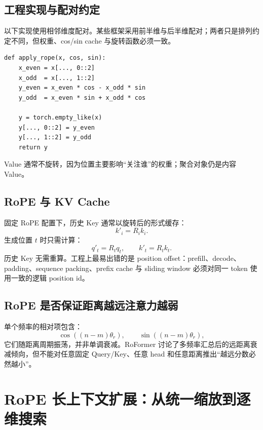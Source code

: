 \documentclass[UTF8,fontset=none,a4paper,10pt]{ctexart}
\begin{document}
\subsection{工程实现与配对约定}

以下实现使用相邻维度配对。某些框架采用前半维与后半维配对；两者只是排列约定不同，但权重、cos/sin cache 与旋转函数必须一致。

\begin{lstlisting}
def apply_rope(x, cos, sin):
    x_even = x[..., 0::2]
    x_odd  = x[..., 1::2]
    y_even = x_even * cos - x_odd * sin
    y_odd  = x_even * sin + x_odd * cos

    y = torch.empty_like(x)
    y[..., 0::2] = y_even
    y[..., 1::2] = y_odd
    return y
\end{lstlisting}

Value 通常不旋转，因为位置主要影响“关注谁”的权重；聚合对象仍是内容 Value。

\subsection{RoPE 与 KV Cache}

固定 RoPE 配置下，历史 Key 通常以旋转后的形式缓存：
\begin{equation}
  k'_i=R_i k_i.
  \label{eq:cached-key}
\end{equation}
生成位置 $t$ 时只需计算：
\begin{equation}
  q'_t=R_tq_t,\qquad k'_t=R_tk_t.
  \label{eq:decode-rope}
\end{equation}
历史 Key 无需重算。工程上最易出错的是 position offset：prefill、decode、padding、sequence packing、prefix cache 与 sliding window 必须对同一 token 使用一致的逻辑 position id。

\subsection{RoPE 是否保证距离越远注意力越弱}

单个频率的相对项包含：
\begin{equation}
  \cos((n-m)\theta_r),\qquad \sin((n-m)\theta_r),
  \label{eq:rope-oscillation}
\end{equation}
它们随距离周期振荡，并非单调衰减。RoFormer 讨论了多频率汇总后的远距离衰减倾向\cite{su2021}，但不能对任意固定 Query/Key、任意 head 和任意距离推出“越远分数必然越小”。

\section{RoPE 长上下文扩展：从统一缩放到逐维搜索}
\end{document}
